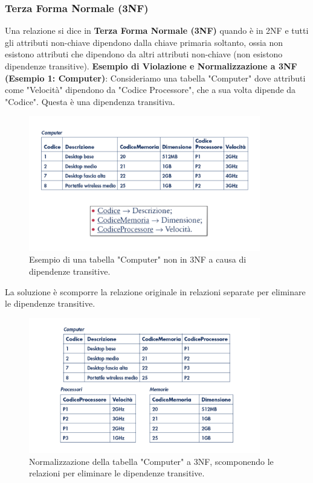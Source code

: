\subsubsection{Terza Forma Normale (3NF)}
Una relazione si dice in \textbf{Terza Forma Normale (3NF)} quando è in 2NF e tutti gli attributi non-chiave dipendono dalla chiave primaria soltanto, ossia non esistono attributi che dipendono da altri attributi non-chiave (non esistono dipendenze transitive).
\textbf{Esempio di Violazione e Normalizzazione a 3NF (Esempio 1: Computer)}:
Consideriamo una tabella "Computer" dove attributi come "Velocità" dipendono da "Codice Processore", che a sua volta dipende da "Codice". Questa è una dipendenza transitiva.
\begin{figure}[h!]
    \centering
    \includegraphics[width=0.9\textwidth]{immagini/nf_3nf_esempio_computer_non_normalizzato.png} %
    \caption{Esempio di una tabella "Computer" non in 3NF a causa di dipendenze transitive.}
    \label{fig:nf_3nf_computer_non_norm}
\end{figure}
La soluzione è scomporre la relazione originale in relazioni separate per eliminare le dipendenze transitive.
\begin{figure}[h!]
    \centering
    \includegraphics[width=0.9\textwidth]{immagini/nf_3nf_esempio_computer_normalizzato.png} %
    \caption{Normalizzazione della tabella "Computer" a 3NF, scomponendo le relazioni per eliminare le dipendenze transitive.}
    \label{fig:nf_3nf_computer_norm}
\end{figure}
